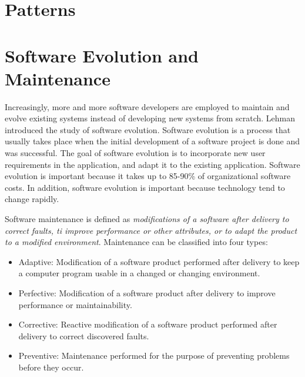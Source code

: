 








\section{Patterns}
























\section{Software Evolution and Maintenance}
Increasingly, more and more software developers are employed to maintain and evolve existing systems instead of developing new systems from scratch\cite{Sommerville:2011:SE}. Lehman\cite{lehman1980programs} introduced the study of software evolution. Software evolution is a process that usually takes place when the initial development of a software project is done and was successful\cite{Bennett:2000:SME:336512.336534}. The goal of software evolution is to incorporate new user requirements in the application, and adapt it to the existing application. Software evolution is important because it takes up to 85-90\% of organizational software costs\cite{Sommerville:2011:SE}. In addition, software evolution is important because technology tend to change rapidly.

Software maintenance is defined as \textit{modifications of a software after delivery to correct faults, ti improve performance or other attributes, or to adapt the product to a modified environment}\cite{720567}. Maintenance can be classified into four types\cite{Bennett:2000:SME:336512.336534,720567}:

\begin{itemize}
	\item Adaptive: Modification of a software product performed after delivery to keep a computer program usable in a changed or changing environment.
	\item Perfective: Modification of a software product after delivery to improve performance or maintainability.
	\item Corrective: Reactive modification of a software product performed after delivery to correct discovered faults.
	\item Preventive: Maintenance performed for the purpose of preventing problems before they occur.
\end{itemize}

